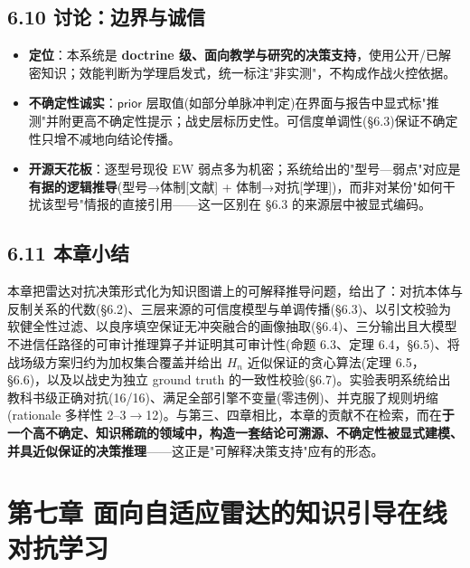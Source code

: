 \documentclass[12pt,a4paper]{ctexart}
\begin{document}
\subsection*{6.10 讨论：边界与诚信}

\begin{itemize}[leftmargin=2em]
\item \textbf{定位}：本系统是 \textbf{doctrine 级、面向教学与研究的决策支持}，使用公开/已解密知识；效能判断为学理启发式，统一标注"非实测"，不构成作战火控依据。
\item \textbf{不确定性诚实}：$\textsf{prior}$ 层取值(如部分单脉冲判定)在界面与报告中显式标"推测"并附更高不确定性提示；战史层标历史性。可信度单调性(§6.3)保证不确定性只增不减地向结论传播。
\item \textbf{开源天花板}：逐型号现役 EW 弱点多为机密；系统给出的"型号—弱点"对应是\textbf{有据的逻辑推导}(型号→体制[文献] + 体制→对抗[学理])，而非对某份"如何干扰该型号"情报的直接引用——这一区别在 §6.3 的来源层中被显式编码。
\end{itemize}


\subsection*{6.11 本章小结}

本章把雷达对抗决策形式化为知识图谱上的可解释推导问题，给出了：对抗本体与反制关系的代数(§6.2)、三层来源的可信度模型与单调传播(§6.3)、以引文校验为软健全性过滤、以良序填空保证无冲突融合的画像抽取(§6.4)、三分输出且大模型不进信任路径的可审计推理算子并证明其可审计性(命题 6.3、定理 6.4，§6.5)、将战场级方案归约为加权集合覆盖并给出 $H_n$ 近似保证的贪心算法(定理 6.5，§6.6)，以及以战史为独立 ground truth 的一致性校验(§6.7)。实验表明系统给出教科书级正确对抗(16/16)、满足全部引擎不变量(零违例)、并克服了规则坍缩(rationale 多样性 2–3$\to$12)。与第三、四章相比，本章的贡献不在检索，而在\textbf{于一个高不确定、知识稀疏的领域中，构造一套结论可溯源、不确定性被显式建模、并具近似保证的决策推理}——这正是"可解释决策支持"应有的形态。



\section*{第七章 面向自适应雷达的知识引导在线对抗学习}
\end{document}
